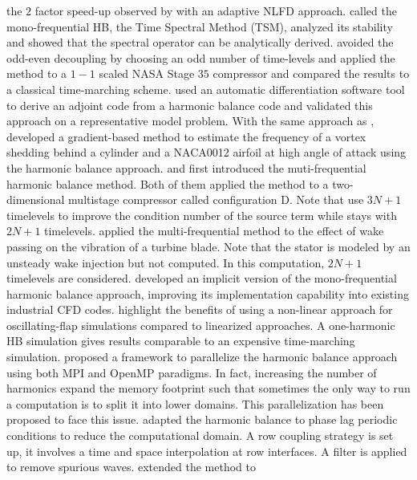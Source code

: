 the $2$ factor speed-up observed by \citet{Mosahebi2013}
with an adaptive NLFD approach.
\citet{Gopinath2005} called the mono-frequential HB,
the Time Spectral Method (TSM), analyzed its stability and
showed that the spectral operator can be analytically derived.
\citet{Weide2005} avoided the odd-even decoupling by choosing 
an odd number of time-levels
and applied the method to a $1-1$ scaled NASA Stage $35$ compressor 
and
compared the results to a classical time-marching scheme.
\citet{Thomas2005b} used an automatic 
differentiation software tool to derive an adjoint code
from a harmonic balance code and validated this approach
on a representative model problem.
With the same approach as \citet{McMullen2002}, \citet{Gopinath2006}
developed a gradient-based method to estimate the frequency of a 
vortex shedding behind a cylinder and a NACA0012 airfoil 
at high angle of attack using the harmonic balance approach.
\citet{Gopinath2007} and \citet{Ekici2007}
first introduced the muti-frequential harmonic balance
method. Both of them applied the method to
a two-dimensional multistage compressor called
configuration D. Note that \citet{Ekici2007} use
$3N+1$ timelevels to improve the condition number
of the source term while \citet{Gopinath2007}
stays with $2N+1$ timelevels.
\citet{Ekici2008a} applied the multi-frequential method
to the effect of wake passing on the vibration of
a turbine blade. Note that the stator is modeled
by an unsteady wake injection but not computed.
In this computation, $2N+1$ timelevels are considered.
\citet{JSicot2008} developed an implicit
version of the mono-frequential harmonic
balance approach, improving its implementation
capability into existing industrial CFD codes.
\citet{JDufour2009} highlight the benefits of using a 
non-linear approach for oscillating-flap simulations
compared to linearized approaches. A one-harmonic HB simulation
gives results comparable to an expensive time-marching simulation.
\citet{Jackson2011} proposed a framework to 
parallelize the harmonic balance approach using
both MPI and OpenMP paradigms. In fact, increasing the
number of harmonics expand the memory footprint such
that sometimes the only way to run a computation is 
to split it into lower domains. This parallelization
has been proposed to face this issue. 
\citet{JSicot2012} adapted the harmonic balance 
to phase lag periodic 
conditions to reduce the computational domain. 
A row coupling strategy is set up, it involves 
a time and space interpolation at row interfaces.
A filter is applied to remove spurious waves.
\citet{Mavriplis2012} extended the method to 
